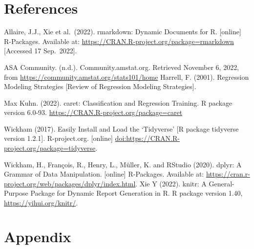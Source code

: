 \documentclass[letterpaper,8pt,twocolumn,twoside,]{pinp}
\begin{document}
\section{References}\label{references}

Allaire, J.J., Xie et al.~(2022). rmarkdown: Dynamic Documents for R.
{[}online{]} R-Packages. Available at:
\url{https://CRAN.R-project.org/package=rmarkdown} {[}Accessed 17
Sep.~2022{]}.

ASA Community. (n.d.). Community.amstat.org. Retrieved November 6, 2022,
from \url{https://community.amstat.org/stats101/home} ‌Harrell, F.
(2001). Regression Modeling Strategies {[}Review of Regression Modeling
Strategies{]}.

Max Kuhn. (2022). caret: Classification and Regression Training. R
package version 6.0-93. \url{https://CRAN.R-project.org/package=caret}

Wickham (2017). Easily Install and Load the `Tidyverse' {[}R package
tidyverse version 1.2.1{]}. R-project.org. {[}online{]}
\url{doi:https://CRAN.R-project.org/package=tidyverse}.

Wickham, H., François, R., Henry, L., Müller, K. and RStudio (2020).
dplyr: A Grammar of Data Manipulation. {[}online{]} R-Packages.
Available at:
\url{https://cran.r-project.org/web/packages/dplyr/index.html}. Xie Y
(2022). knitr: A General-Purpose Package for Dynamic Report Generation
in R. R package version 1.40, \url{https://yihui.org/knitr/}.

\newpage

\section{Appendix}\label{appendix}
\end{document}
